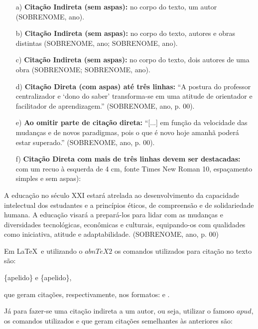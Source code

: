 \documentclass{sep}
\begin{document}
\begin{enumerate}
 \item [a)] \textbf{Citação Indireta (sem aspas):} no corpo do texto, um autor (SOBRENOME, ano).

 \item [b)] \textbf{Citação Indireta (sem aspas):} no corpo do texto, autores e obras distintas (SOBRENOME, ano; SOBRENOME, ano).

 \item [c)] \textbf{Citação Indireta (sem aspas):} no corpo do texto, dois autores de uma obra (SOBRENOME; SOBRENOME, ano).

 \item [d)] \textbf{Citação Direta (com aspas) até três linhas:} ``A postura do professor centralizador e `dono do saber' transforma-se
 em uma atitude de orientador e facilitador de aprendizagem.'' (SOBRENOME, ano, p. 00).

 \item [e)] \textbf{Ao omitir parte de citação direta:} ``[...] em função da velocidade das mudanças e de novos paradigmas, pois o que
 é novo hoje amanhã poderá estar superado.'' (SOBRENOME, ano, p. 00).

 \item [f)] \textbf{Citação Direta com mais de três linhas devem ser
 destacadas:} com um recuo à esquerda de 4 cm, fonte Times New Roman 10, espaçamento simples e sem aspas):
\end{enumerate}

\begin{citacao}
  A educação no século XXI estará atrelada ao desenvolvimento da capacidade intelectual dos estudantes e a princípios éticos, de compreensão e de solidariedade humana.
  A educação visará a prepará-los para lidar com as mudanças e diversidades tecnológicas, econômicas e culturais, equipando-os com qualidades como iniciativa, atitude e adaptabilidade.
  (SOBRENOME, ano, p. 00)
\end{citacao}

Em \LaTeX ~e utilizando o $abnTeX2$ os comandos utilizados para citação no texto são:

\begin{center}
  \{apelido\} e \{apelido\},
\end{center}

\noindent que geram citações, respectivamente, nos formatos: \cite{chia} e .

Já para fazer-se uma citação indireta a um autor, ou seja, utilizar o famoso $apud$, os comandos utilizados e que geram citações semelhantes às anteriores são:
\end{document}
